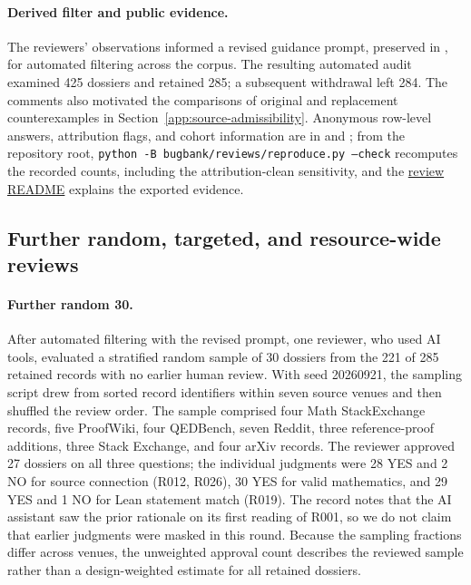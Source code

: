 \paragraph{Derived filter and public evidence.}
The reviewers' observations informed a revised guidance prompt, preserved in , for automated filtering across the corpus. The resulting automated audit examined 425 dossiers and retained 285; a subsequent withdrawal left 284. The comments also motivated the comparisons of original and replacement counterexamples in Section~\ref{app:source-admissibility}. Anonymous row-level answers, attribution flags, and cohort information are in  and ; from the repository root, \texttt{python -B bugbank/reviews/reproduce.py --check} recomputes the recorded counts, including the attribution-clean sensitivity, and the \href{https://github.com/qqliu/CoPEER/blob/main/bugbank/reviews/README.md}{review README} explains the exported evidence.



\subsection{Further random, targeted, and resource-wide reviews}
\label{app:additional-human-reviews}

\paragraph{Further random 30.}
After automated filtering with the revised prompt, one reviewer, who used AI tools, evaluated a stratified random sample of 30 dossiers from the 221 of 285 retained records with no earlier human review. With seed 20260921, the sampling script drew from sorted record identifiers within seven source venues and then shuffled the review order. The sample comprised four Math StackExchange records, five ProofWiki, four QEDBench, seven Reddit, three reference-proof additions, three Stack Exchange, and four arXiv records. The reviewer approved 27 dossiers on all three questions; the individual judgments were 28 YES and 2 NO for source connection (R012, R026), 30 YES for valid mathematics, and 29 YES and 1 NO for Lean statement match (R019). The record notes that the AI assistant saw the prior rationale on its first reading of R001, so we do not claim that earlier judgments were masked in this round. Because the sampling fractions differ across venues, the unweighted approval count describes the reviewed sample rather than a design-weighted estimate for all retained dossiers.

